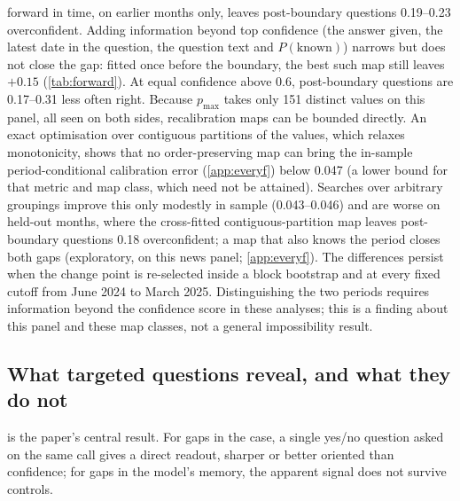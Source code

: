 \documentclass[10pt,twocolumn]{article}
\newcommand{\pmax}{p_{\max}}
\begin{document}
forward in time, on earlier months only, leaves post-boundary questions
0.19--0.23 overconfident. Adding information beyond top confidence (the
answer given, the latest date in the question, the question text and
$P(\text{known})$) narrows but does not close the gap: fitted once before
the boundary, the best such map still leaves $+0.15$ (\cref{tab:forward}).
At equal confidence above 0.6, post-boundary questions are 0.17--0.31 less
often right. Because $\pmax$ takes only 151 distinct values on this panel, all
seen on both sides, recalibration maps can be bounded directly. An exact
optimisation over contiguous partitions of the values, which relaxes
monotonicity, shows that no order-preserving map can bring the in-sample
period-conditional calibration error (\cref{app:everyf}) below 0.047 (a
lower bound for that metric and map class, which need not be attained). Searches over arbitrary
groupings improve this only modestly in sample (0.043--0.046) and are worse on
held-out months, where the cross-fitted contiguous-partition map leaves
post-boundary questions 0.18 overconfident; a map that also knows the period
closes both gaps (exploratory, on this news panel; \cref{app:everyf}). The
differences persist when the change point is re-selected inside a block
bootstrap and at every fixed cutoff from June 2024 to March 2025.
Distinguishing the two periods requires information beyond the confidence
score in these analyses; this is a finding about this panel and these map
classes, not a general impossibility result.

\subsection{What targeted questions reveal, and what they do not}
\label{sec:followups}



 is the paper's central result. For gaps in the case, a single
yes/no question asked on the same call gives a direct readout, sharper or
better oriented than confidence; for
gaps in the model's memory, the apparent signal does not survive controls.
\end{document}
